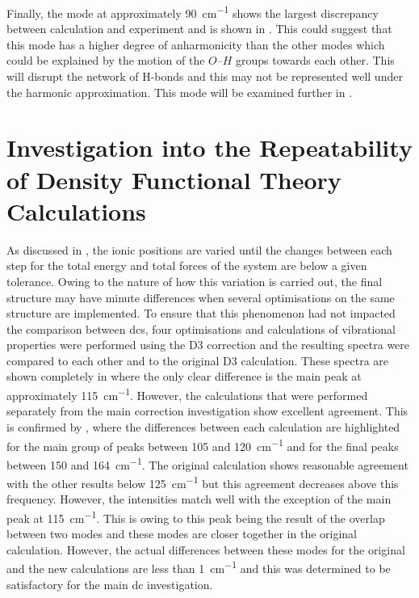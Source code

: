 Finally, the mode at approximately \SI{90}{cm^{-1}} shows the largest discrepancy between calculation and experiment and is shown in . This could suggest that this mode has a higher degree of anharmonicity than the other modes which could be explained by the motion of the \(O\)\nobreakdash--\(H\) groups towards each other. This will disrupt the network of H\nobreakdash-bonds and this may not be represented well under the harmonic approximation. This mode will be examined further in .

\section{Investigation into the Repeatability of Density Functional Theory Calculations}
\label{sec:simstud}
As discussed in , the ionic positions are varied until the changes between each step for the total energy and total forces of the system are below a given tolerance. Owing to the nature of how this variation is carried out, the final structure may have minute differences when several optimisations on the same structure are implemented. To ensure that this phenomenon had not impacted the comparison between \acrshort{dc}s, four \DIFdelbegin {}\DIFdelend \DIFaddbegin {}\DIFaddend optimisations and calculations of vibrational properties were performed using the D3 correction and the resulting spectra were compared to each other and to the original D3 calculation\DIFdelbegin {}\DIFdelend . These spectra are shown completely in  where the only clear difference is the main peak at approximately \SI{115}{cm^{-1}}. However, the calculations that were performed separately from the main correction investigation show excellent agreement. This is confirmed by , where the differences between each calculation are highlighted for the main group of peaks between 105 and \SI{120}{cm^{-1}} and for the final peaks between 150 and \SI{164}{cm^{-1}}. The original calculation shows reasonable agreement with the other results below \SI{125}{cm^{-1}} but this agreement decreases above this frequency. However, the intensities match well with the exception of the main peak at \SI{115}{cm^{-1}}. This is owing to this peak being the result of the overlap between two modes and these modes are closer together in the original calculation. However, the actual differences between these modes for the original and the new calculations are less than \SI{1}{cm^{-1}} and this was determined to be satisfactory for the main \acrshort{dc} investigation. 

